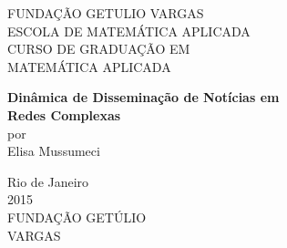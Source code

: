 \documentclass[a4paper,12pt]{article}
\begin{document}



\begin{titlepage}
 \begin{center}
  { \large FUNDAÇÃO GETULIO VARGAS}\\[0.3cm]
  { \large ESCOLA DE MATEMÁTICA APLICADA}\\[0.5cm]
  { \large CURSO DE GRADUAÇÃO EM}\\[0.3cm]
  { \large MATEMÁTICA APLICADA}\\[0.3cm]
 
  \vspace{55 mm}

  {\bf \large Dinâmica de Disseminação de Notícias em}\\[0.1cm]
  {\bf \large Redes Complexas}\\[1.7cm]

  { por}\\[0.6cm]
  {\large Elisa Mussumeci}\\[0.1cm]


  \vspace{7cm}

  { Rio de Janeiro}\\[0.1cm]
  { 2015}\\[0.6cm]
  { FUNDAÇÃO GETÚLIO}\\[0.1cm]
  { VARGAS}\\[0.1cm]
 \end{center}
\end{titlepage}
\end{document}
